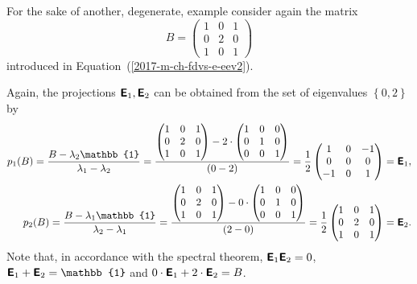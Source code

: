 {For the sake of another, degenerate, example consider again the
{matrix}
\begin{equation}
B=
\begin{pmatrix}
1&0&1\\
0&2&0\\
1&0&1
\end{pmatrix}
\end{equation}
introduced in Equation~(\ref{2017-m-ch-fdvs-e-eev2}).



Again, the projections $\textsf{\textbf{E}}_1, \textsf{\textbf{E}}_2$
can be obtained from  the set of eigenvalues $\left\{  0,2 \right\}$ by
\begin{equation}
\begin{split}
p_1(B)=   \frac{B-\lambda_2\mathbb{1}}{\lambda_1-\lambda_2}
=
\frac{
\begin{pmatrix}
1&0&1\\
0&2&0\\
1&0&1
\end{pmatrix}
-
2\cdot
\begin{pmatrix}
1&0&0\\
0&1&0\\
0&0&1
\end{pmatrix}
}
{(0-2)}
=
\frac{1}{2}
\begin{pmatrix}
1&0&-1\\
0&0&0\\
-1&0&1
\end{pmatrix}
=\textsf{\textbf{E}}_1
,\\
p_2(B)=   \frac{B-\lambda_1\mathbb{1}}{\lambda_2-\lambda_1}
=
\frac{
\begin{pmatrix}
1&0&1\\
0&2&0\\
1&0&1
\end{pmatrix}
-
0\cdot
\begin{pmatrix}
1&0&0\\
0&1&0\\
0&0&1
\end{pmatrix}
}
{(2-0)}
=
\frac{1}{2}
\begin{pmatrix}
1&0&1\\
0&2&0\\
1&0&1
\end{pmatrix}
=\textsf{\textbf{E}}_2.
\end{split}
\end{equation}
Note that, in accordance with the spectral theorem,
$\textsf{\textbf{E}}_1 \textsf{\textbf{E}}_2=0 $,
$\textsf{\textbf{E}}_1+\textsf{\textbf{E}}_2=\mathbb{1}$
and
$0\cdot \textsf{\textbf{E}}_1+2\cdot \textsf{\textbf{E}}_2=B$.

\eexample
}







